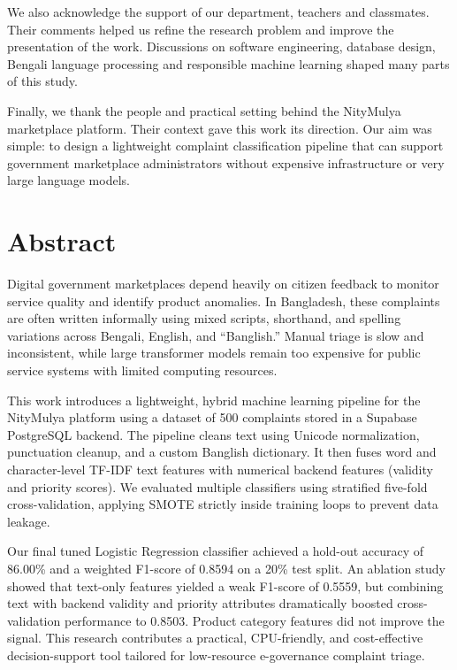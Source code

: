 \documentclass[12pt,a4paper,openany]{book}
\begin{document}
We also acknowledge the support of our department, teachers and classmates. Their comments helped us refine the research problem and improve the presentation of the work. Discussions on software engineering, database design, Bengali language processing and responsible machine learning shaped many parts of this study.

Finally, we thank the people and practical setting behind the NityMulya marketplace platform. Their context gave this work its direction. Our aim was simple: to design a lightweight complaint classification pipeline that can support government marketplace administrators without expensive infrastructure or very large language models.

\chapter*{Abstract}
Digital government marketplaces depend heavily on citizen feedback to monitor service quality and identify product anomalies. In Bangladesh, these complaints are often written informally using mixed scripts, shorthand, and spelling variations across Bengali, English, and ``Banglish.'' Manual triage is slow and inconsistent, while large transformer models remain too expensive for public service systems with limited computing resources.

This work introduces a lightweight, hybrid machine learning pipeline for the NityMulya platform using a dataset of 500 complaints stored in a Supabase PostgreSQL backend. The pipeline cleans text using Unicode normalization, punctuation cleanup, and a custom Banglish dictionary. It then fuses word and character-level TF-IDF text features with numerical backend features (validity and priority scores). We evaluated multiple classifiers using stratified five-fold cross-validation, applying SMOTE strictly inside training loops to prevent data leakage. 

Our final tuned Logistic Regression classifier achieved a hold-out accuracy of 86.00\% and a weighted F1-score of 0.8594 on a 20\% test split. An ablation study showed that text-only features yielded a weak F1-score of 0.5559, but combining text with backend validity and priority attributes dramatically boosted cross-validation performance to 0.8503. Product category features did not improve the signal. This research contributes a practical, CPU-friendly, and cost-effective decision-support tool tailored for low-resource e-governance complaint triage.
\end{document}
